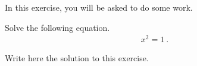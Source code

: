 \documentclass[11pt,a4paper]{article}
\begin{document}
\MakeUebungHeader


In this exercise, you will be asked to do some work.

\begin{exenumerate}
\item Solve the following equation.
    \begin{align}
        x^2 = 1\ .
    \end{align}
  
    \begin{solution}
        Write here the solution to this exercise.
    \end{solution}
\end{exenumerate}
\end{document}
